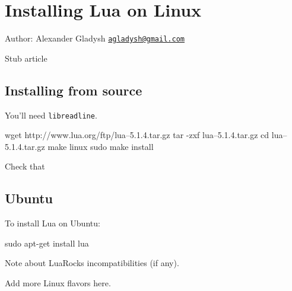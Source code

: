 \section{Installing Lua on Linux}

Author: Alexander Gladysh
\href{mailto:agladysh@gmail.com}{\texttt{agladysh@gmail.com}}

\begin{WARNING}
Stub article
\end{WARNING}

\subsection{Installing from source}

You'll need \verb!libreadline!.

\begin{CONSOLE}
wget http://www.lua.org/ftp/lua--5.1.4.tar.gz
tar -zxf lua--5.1.4.tar.gz
cd lua--5.1.4.tar.gz
make linux
sudo make install
\end{CONSOLE}

\begin{TODO}Check that\end{TODO}

\subsection{Ubuntu}

To install Lua on Ubuntu:

\begin{CONSOLE}
sudo apt-get install lua
\end{CONSOLE}

\begin{TODO}Note about LuaRocks incompatibilities (if any).\end{TODO}

\begin{TODO}Add more Linux flavors here.\end{TODO}
